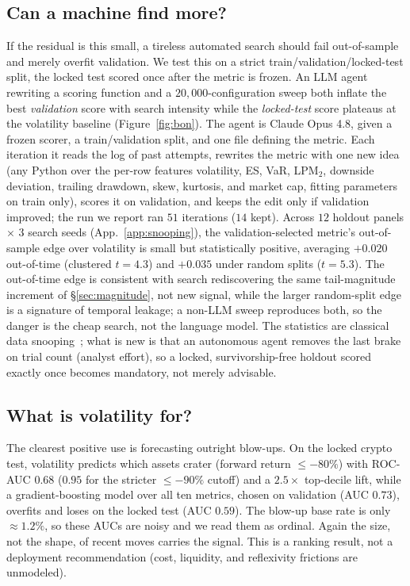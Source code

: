 \documentclass[sigconf,nonacm]{acmart}
\begin{document}
\subsection{Can a machine find more?}
If the residual is this small, a tireless automated
search should fail out-of-sample and merely overfit validation. We test this on a strict
train/validation/locked-test split, the locked test scored once after the metric
is frozen. An LLM agent rewriting a scoring function and a $20{,}000$-configuration sweep
both inflate the best \emph{validation} score with search intensity while the
\emph{locked-test} score plateaus at the volatility baseline (Figure~\ref{fig:bon}). The
agent is Claude Opus 4.8, given a frozen scorer, a train/validation split, and one file
defining the metric. Each iteration it reads the log of past attempts, rewrites the metric
with one new idea (any Python over the per-row features volatility, ES, VaR, LPM$_2$,
downside deviation, trailing drawdown, skew, kurtosis, and market cap, fitting parameters
on train only), scores it on validation, and keeps the edit only if validation improved;
the run we report ran $51$ iterations ($14$ kept). Across $12$ holdout
panels $\times$ $3$ search seeds (App.~\ref{app:snooping}), the validation-selected
metric's out-of-sample edge over volatility is small but statistically positive, averaging
$+0.020$ out-of-time (clustered $t=4.3$) and $+0.035$ under random splits ($t=5.3$). The
out-of-time edge is consistent with search rediscovering the same tail-magnitude increment
of \S\ref{sec:magnitude}, not new signal, while the larger random-split edge is a signature
of temporal leakage; a non-LLM sweep reproduces both, so the danger is the cheap
search, not the language model. The statistics are classical data
snooping~\cite{white2000,sullivan1999,bailey2017}; what is new is that an autonomous agent
removes the last brake on trial count (analyst effort), so a locked, survivorship-free
holdout scored exactly once becomes mandatory, not merely advisable.

\subsection{What is volatility for?}
The clearest positive use is forecasting outright
blow-ups. On the locked crypto test, volatility predicts which assets crater (forward
return $\le -80\%$) with ROC-AUC $0.68$ ($0.95$
for the stricter $\le -90\%$ cutoff) and a $2.5\times$
top-decile lift, while a gradient-boosting model over all ten metrics, chosen on
validation (AUC $0.73$), overfits and loses on the locked test (AUC $0.59$). The
blow-up base rate is only ${\approx}1.2\%$, so these AUCs are noisy and we read them as
ordinal. Again the size, not the shape, of recent moves carries the
signal. This is a ranking result, not a deployment recommendation (cost, liquidity, and
reflexivity frictions are unmodeled).
\end{document}
